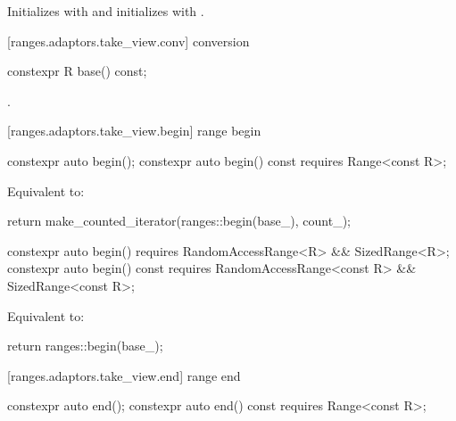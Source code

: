 \begin{itemdescr}
\pnum
\effects Initializes  with 
and initializes  with .
\end{itemdescr}

[ranges.adaptors.take_view.conv]{ conversion}

%
\begin{itemdecl}
constexpr R base() const;
\end{itemdecl}

\begin{itemdescr}
\pnum
\returns {}.
\end{itemdescr}

[ranges.adaptors.take_view.begin]{ range begin}

%
\begin{itemdecl}
constexpr auto begin();
constexpr auto begin() const requires Range<const R>;
\end{itemdecl}

\begin{itemdescr}
\pnum
\effects Equivalent to:
\begin{codeblock}
return make_counted_iterator(ranges::begin(base_), count_);
\end{codeblock}
\end{itemdescr}

%
\begin{itemdecl}
constexpr auto begin() requires RandomAccessRange<R> && SizedRange<R>;
constexpr auto begin() const
  requires RandomAccessRange<const R> && SizedRange<const R>;
\end{itemdecl}

\begin{itemdescr}
\pnum
\effects Equivalent to:
\begin{codeblock}
return ranges::begin(base_);
\end{codeblock}
\end{itemdescr}

[ranges.adaptors.take_view.end]{ range end}

%
\begin{itemdecl}
constexpr auto end();
constexpr auto end() const requires Range<const R>;
\end{itemdecl}

